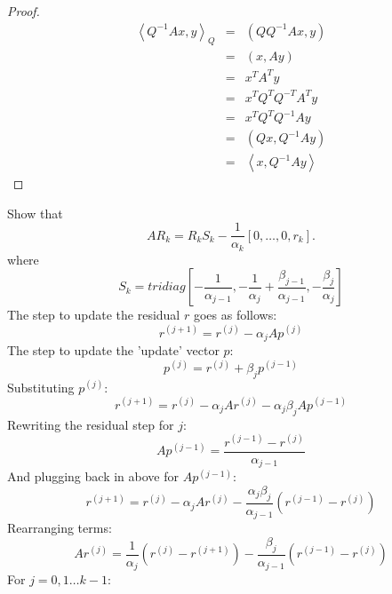 \documentclass{article}
\newcommand{\ea}[1]{\begin{eqnarray*}#1\end{eqnarray*}}
\newcommand{\inv}[1]{#1^{-1}}
\newcommand{\inner}[1]{\left\langle {#1} \right\rangle}
\begin{document}
\begin{proof}
	\ea{
		\inner{\inv{Q}Ax,y}_Q &=&  (Q\inv{Q}Ax, y) \\
			&=& (x,Ay) \\
			&=&  x^TA^Ty \\
			&=& x^TQ^TQ^{-T}A^Ty \\
			&=& x^TQ^TQ^{-1}Ay \\
			&=& (Qx, \inv{Q}Ay) \\
			&=& \inner{ x, \inv{Q}Ay}
		}
\end{proof}
Show that
\[              AR_k = R_k S_k - \frac{1}{\alpha_k}[0, \dots , 0, r_k ].   \]
where
\[ S_k = \textit{tridiag}\left[ -\frac{1}{\alpha_{j-1}}, 
                                -\frac{1}{\alpha_j} + \frac{\beta_{j-1}}{\alpha_{j-1}},
								-\frac{\beta_j}{\alpha_j} \right]
\]
 The step to update the residual $r$ goes as follows:
\[ r^{(j+1)} = r^{(j)} - \alpha_j A p^{(j)} \]
The step to update the 'update' vector $p$:
\[ p^{(j)} = r^{(j)} + \beta_j p^{(j-1)} \]
Substituting $p^{(j)}$:
\[ r^{(j+1)} = r^{(j)} - \alpha_j A  r^{(j)} - \alpha_j\beta_j A p^{(j-1)} \]
Rewriting the residual step for $j$:
\[ A p^{(j-1)} = \frac{ r^{(j-1)} - r^{(j)} }{\alpha_{j-1}} \]
And plugging back in above for $A p^{(j-1)}$:
\[  r^{(j+1)} = r^{(j)} - \alpha_j A  r^{(j)} - \frac{\alpha_j\beta_j}{\alpha_{j-1}} \left( r^{(j-1)} - r^{(j)} \right) \]
Rearranging terms:
\[ A r^{(j)} = \frac{1}{\alpha_j}(r^{(j)} - r^{(j+1)}) - \frac{\beta_j}{\alpha_{j-1}}  \left( r^{(j-1)} - r^{(j)} \right) \]
For $j=0,1\dots k-1$:
\end{document}
